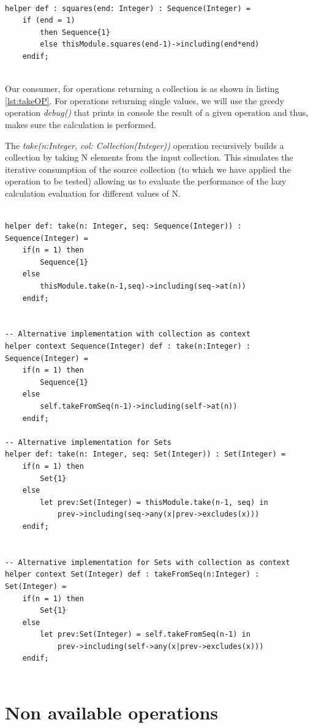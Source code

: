 \begin{lstlisting}[language=ATL, style=AMMA,
label=lst:SquaresOP, caption=Squares() operation] 

helper def : squares(end: Integer) : Sequence(Integer) =
	if (end = 1)
		then Sequence{1}
		else thisModule.squares(end-1)->including(end*end)
	endif;


\end{lstlisting}

Our consumer, for operations returning a collection is as shown in listing
\ref{lst:takeOP}. For operations returning single values, we will use the greedy
operation \emph{debug()} that prints in console the result of a given operation
and thus, makes sure the calculation is performed.

The \emph{take(n:Integer, col: Collection(Integer))} operation recursively
builds a collection by taking N elements from the input collection. This
simulates the iterative consumption of the source collection (to which we have
applied the operation to be tested) allowing us to evaluate the performance of
the lazy calculation evaluation for different values of N.

\begin{lstlisting}[language=ATL, style=AMMA,
label=lst:takeOP, caption=take() operation] 

helper def: take(n: Integer, seq: Sequence(Integer)) : Sequence(Integer) = 
	if(n = 1) then
		Sequence{1}
	else
		thisModule.take(n-1,seq)->including(seq->at(n))
	endif;


-- Alternative implementation with collection as context
helper context Sequence(Integer) def : take(n:Integer) : Sequence(Integer) = 
	if(n = 1) then
		Sequence{1}
	else
		self.takeFromSeq(n-1)->including(self->at(n))
	endif;

-- Alternative implementation for Sets	
helper def: take(n: Integer, seq: Set(Integer)) : Set(Integer) = 
	if(n = 1) then
		Set{1}
	else
		let prev:Set(Integer) = thisModule.take(n-1, seq) in
			prev->including(seq->any(x|prev->excludes(x)))
	endif;
	

-- Alternative implementation for Sets with collection as context
helper context Set(Integer) def : takeFromSeq(n:Integer) : Set(Integer) = 
	if(n = 1) then
		Set{1}
	else
		let prev:Set(Integer) = self.takeFromSeq(n-1) in
			prev->including(self->any(x|prev->excludes(x)))
	endif;
	

\end{lstlisting}

\section{Non available operations}

